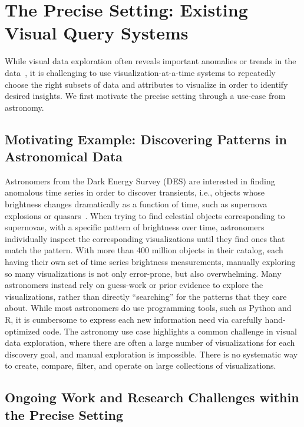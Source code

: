 \documentclass[11pt]{article}
\begin{document}

\section{The Precise Setting: Existing Visual Query Systems}\label{sec:precise}
While visual data exploration often reveals 
important anomalies or trends 
in the data~\cite{Heer2012,Morton2014}, 
it is challenging to 
use visualization-at-a-time systems to 
repeatedly choose the right subsets of 
data and attributes to visualize
in order to identify desired insights.
We first motivate the precise setting through a use-case from astronomy.

\subsection{Motivating Example: Discovering Patterns in Astronomical Data}
Astronomers from the Dark Energy Survey (DES) 
are interested in finding 
anomalous time series 
in order to discover 
transients, 
i.e., objects whose brightness 
changes dramatically as a function of time, 
such as supernova explosions or quasars~\cite{Drlica-Wagner2017}. 
When trying to find celestial objects 
corresponding to supernovae, 
with a specific pattern of brightness over time, 
astronomers individually inspect the corresponding 
visualizations until 
they find ones that match the pattern. 
With more than 400 million objects in their catalog, 
each having their own set of time series brightness measurements, 
manually exploring so many 
visualizations is not only error-prone, 
but also overwhelming.
Many astronomers instead rely on guess-work 
or prior evidence to explore the visualizations,
rather than directly ``searching'' for the patterns
that they care about. 
While most astronomers do use 
programming tools, such as Python and R,
it is cumbersome to express each new information need
via carefully hand-optimized code. 
The astronomy use case highlights a 
common challenge in visual data exploration,
where there are often a large number of visualizations
for each discovery goal,
and manual exploration is impossible.
There is no systematic way to create, compare, filter,
and operate on large collections of visualizations.

\subsection{Ongoing Work and Research Challenges within the Precise Setting}
\end{document}
